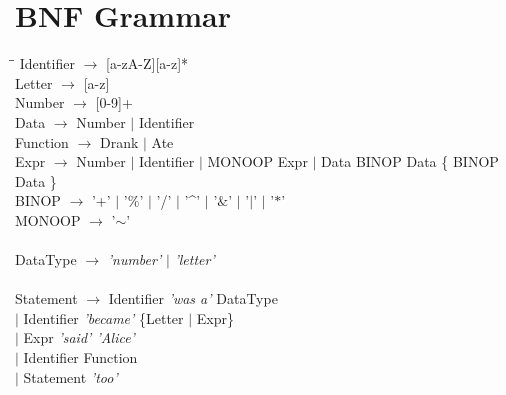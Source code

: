 \documentclass[a4wide, 11pt]{article}
\begin{document}
\section{BNF Grammar}
\label{sec:bnf}
	\begin{tabbing}
	\hspace*{9mm}\=\hspace*{25mm}\=\kill
		\> Identifier $\rightarrow$ [a-zA-Z][a-z]* \\
		\> Letter $\rightarrow$ [a-z] \\
		\> Number $\rightarrow$ [0-9]+ \\
		\> Data $\rightarrow$ Number $\mid$ Identifier \\
		\> Function $\rightarrow$ Drank $\mid$ Ate \\
		\> Expr	$\rightarrow$ Number $\mid$ Identifier $\mid$ MONOOP Expr 
					$\mid$ Data BINOP Data \{ BINOP Data \}\\
		\> BINOP $\rightarrow$ '+' $\mid$ '$\%$' $\mid$ '/' $\mid$ '\^{ }' 
							$\mid$ '$\&$' $\mid$ '$\mid$' $\mid$ '$\ast$' \\
		\> MONOOP $\rightarrow$ '$\mathtt{\sim}$'\\
		\\
		\> DataType $\rightarrow$ \emph{'number'} $\mid$ \emph{'letter'} \\
		\\
		\> Statement $\rightarrow$ Identifier \emph{'was a'} DataType \\
		\> \> $\mid$ Identifier \emph{'became'} \{Letter $\mid$ Expr\} \\
		\> \>	$\mid$ Expr \emph{'said' 'Alice'} \\
		\> \> $\mid$ Identifier Function \\
		\> \>	$\mid$ Statement \emph{'too'} \\
	\end{tabbing}

\begin{verbatim}
\end{verbatim}
\end{document}
